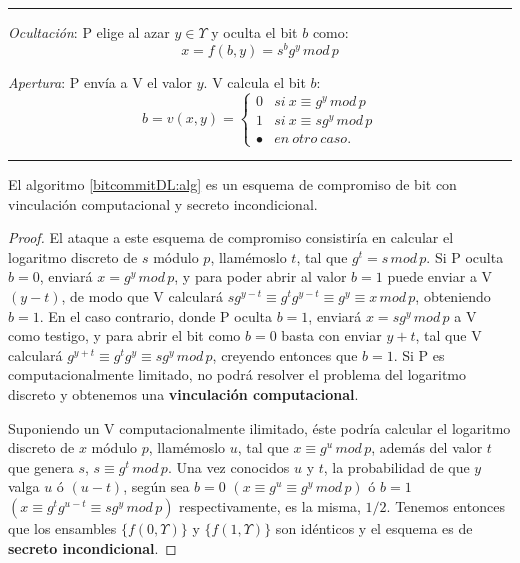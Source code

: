 \hfil

\rule{\textwidth}{1pt}
\begin{algorithm}
	\hfil
	
	\textit{Ocultación}: P elige al azar $y\in \Upsilon$ y oculta el bit $b$ como:
	\[x = f(b,y) = s^b g^y \, mod \, p \]
	
	\textit{Apertura}: P envía a V el valor $y$. V calcula el bit $b$:
	\[ b = v(x,y) = 
	\begin{cases}
	0  & si\ x\equiv g^y \, mod \, p  \\
	1 & si\ x\equiv s g^y \, mod \, p \\
	\bullet & en\ otro\ caso.
	\end{cases}
	\]
	\label{bitcommitDL:alg}
\end{algorithm}
\rule{\textwidth}{1pt}

\hfil

\begin{proposition}
	El algoritmo \ref{bitcommitDL:alg} es un esquema de compromiso de bit con vinculación computacional y secreto incondicional.
\end{proposition}

\begin{proof}
	
	El ataque a este esquema de compromiso consistiría en calcular el logaritmo discreto de $s$ módulo $p$, llamémoslo $t$, tal que $g^t=s\,mod\,p$. Si P oculta $b=0$, enviará $x=g^y\,mod\,p$, y para poder abrir al valor $b=1$ puede enviar a V  $(y-t)$, de modo que V calculará $sg^{y-t}\equiv g^t g^{y-t} \equiv g^y \equiv x \, mod \, p$, obteniendo $b=1$. En el caso contrario, donde P oculta $b=1$, enviará $x=sg^y\,mod\, p$ a V como testigo, y para abrir el bit como $b=0$ basta con enviar $y+t$, tal que V calculará $g^{y+t}\equiv g^t g^y \equiv s g^y\, mod\, p$, creyendo entonces que $b=1$. Si P es computacionalmente limitado, no podrá resolver el problema del logaritmo discreto y obtenemos una \textbf{vinculación computacional}.
	
	Suponiendo un V computacionalmente ilimitado, éste podría calcular el logaritmo discreto de $x$ módulo $p$, llamémoslo $u$, tal que $x\equiv g^u\,mod\,p$, además del valor $t$ que genera $s$, $s\equiv g^t\,mod\,p$. Una vez conocidos $u$ y $t$, la probabilidad de que $y$ valga $u$ ó $(u-t)$, según sea $b=0$  $(x\equiv g^u \equiv g^y \,mod\,p)$ ó $b=1$ $(x\equiv g^t g^{u-t} \equiv sg^y \,mod\,p)$ respectivamente, es la misma, $1/2$.
	Tenemos entonces que los ensambles $\{f(0,\Upsilon)\}$ y $\{f(1,\Upsilon)\}$ son idénticos y el esquema es de \textbf{secreto incondicional}.
	
\end{proof}


